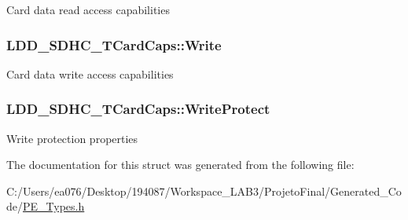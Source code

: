Card data read access capabilities \hypertarget{struct_l_d_d___s_d_h_c___t_card_caps_ad28c378a6b9edfbd726a8019d5c8be79}{
\subsubsection[{Write}]{ L\-D\-D\-\_\-\-S\-D\-H\-C\-\_\-\-T\-Card\-Caps\-::\-Write}}\label{struct_l_d_d___s_d_h_c___t_card_caps_ad28c378a6b9edfbd726a8019d5c8be79}
Card data write access capabilities \hypertarget{struct_l_d_d___s_d_h_c___t_card_caps_a32ecbbace3b435b1d70a57b09bf9662b}{
\subsubsection[{Write\-Protect}]{ L\-D\-D\-\_\-\-S\-D\-H\-C\-\_\-\-T\-Card\-Caps\-::\-Write\-Protect}}\label{struct_l_d_d___s_d_h_c___t_card_caps_a32ecbbace3b435b1d70a57b09bf9662b}
Write protection properties 

The documentation for this struct was generated from the following file\-:\begin{DoxyCompactItemize}
\item 
C\-:/\-Users/ea076/\-Desktop/194087/\-Workspace\-\_\-\-L\-A\-B3/\-Projeto\-Final/\-Generated\-\_\-\-Code/\hyperlink{_p_e___types_8h}{P\-E\-\_\-\-Types.\-h}\end{DoxyCompactItemize}
